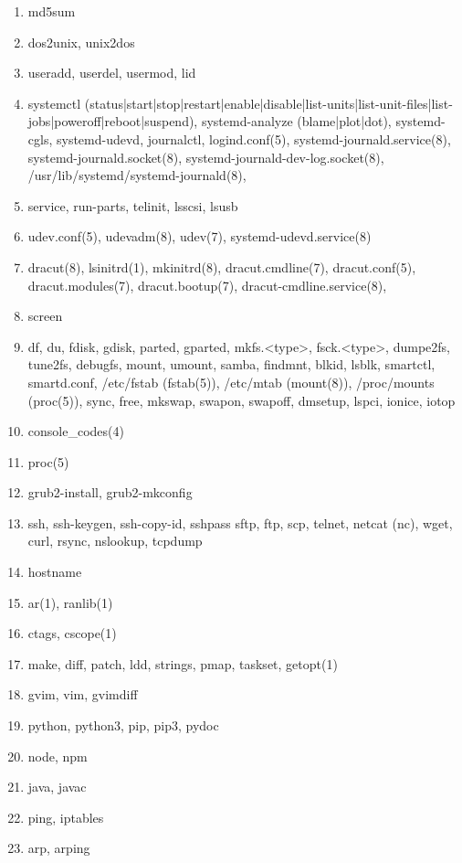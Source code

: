 \documentclass{article}
\begin{document}
\begin{enumerate}
\begin{enumerate}
            \item md5sum
            \item dos2unix, unix2dos
            \item useradd, userdel, usermod, lid
            \item systemctl (status|start|stop|restart|enable|disable|list-units|list-unit-files|list-jobs|poweroff|reboot|suspend), systemd-analyze (blame|plot|dot), systemd-cgls, systemd-udevd, journalctl, logind.conf(5), systemd-journald.service(8), systemd-journald.socket(8), systemd-journald-dev-log.socket(8), /usr/lib/systemd/systemd-journald(8),
            \item service, run-parts, telinit, lsscsi, lsusb
            \item udev.conf(5), udevadm(8), udev(7), systemd-udevd.service(8)
            \item dracut(8), lsinitrd(1), mkinitrd(8), dracut.cmdline(7), dracut.conf(5), dracut.modules(7), dracut.bootup(7), dracut-cmdline.service(8),
            \item screen
            \item df, du, fdisk, gdisk, parted, gparted, mkfs.<type>, fsck.<type>, dumpe2fs, tune2fs, debugfs, mount, umount, samba, findmnt, blkid, lsblk, smartctl, smartd.conf, /etc/fstab (fstab(5)), /etc/mtab (mount(8)), /proc/mounts (proc(5)), sync, free, mkswap, swapon, swapoff, dmsetup, lspci, ionice, iotop
            \item console_codes(4)
            \item proc(5)
            \item grub2-install, grub2-mkconfig
            \item ssh, ssh-keygen, ssh-copy-id, sshpass sftp, ftp, scp, telnet, netcat (nc), wget, curl, rsync, nslookup, tcpdump
            \item hostname
            \item ar(1), ranlib(1)
            \item ctags, cscope(1)
            \item make, diff, patch, ldd, strings, pmap, taskset, getopt(1)
            \item gvim, vim, gvimdiff
            \item python, python3, pip, pip3, pydoc
            \item node, npm
            \item java, javac
            \item ping, iptables
            \item arp, arping

\end{enumerate}
\end{enumerate}
\end{document}
